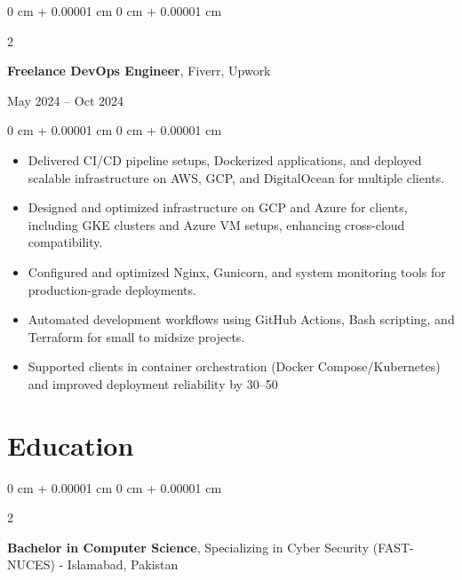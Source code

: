 \documentclass[10pt, letterpaper]{article}
\newenvironment{highlights}{
    \begin{itemize}[
        topsep=0.10 cm,
        parsep=0.10 cm,
        partopsep=0pt,
        itemsep=0pt,
        leftmargin=0 cm + 10pt
    ]
}{
    \end{itemize}
}
\newenvironment{onecolentry}{
    \begin{adjustwidth}{
        0 cm + 0.00001 cm
    }{
        0 cm + 0.00001 cm
    }
}{
    \end{adjustwidth}
}
\newenvironment{twocolentry}[2][]{
    \onecolentry
    \def\secondColumn{#2}
    \setcolumnwidth{\fill, 4.5 cm}
    \begin{paracol}{2}
}{
    \switchcolumn \raggedleft \secondColumn
    \end{paracol}
    \endonecolentry
}
\begin{document}
\vspace{0.10 cm}

\begin{twocolentry}{May 2024 -- Oct 2024}
    \textbf{Freelance DevOps Engineer}, Fiverr, Upwork
\end{twocolentry}
\vspace{0.10 cm}
\begin{onecolentry}
    \begin{highlights}
        \item Delivered CI/CD pipeline setups, Dockerized applications, and deployed scalable infrastructure on AWS, GCP, and DigitalOcean for multiple clients.
        \item Designed and optimized infrastructure on GCP and Azure for clients, including GKE clusters and Azure VM setups, enhancing cross-cloud compatibility.
        \item Configured and optimized Nginx, Gunicorn, and system monitoring tools for production-grade deployments.
        \item Automated development workflows using GitHub Actions, Bash scripting, and Terraform for small to midsize projects.
        \item Supported clients in container orchestration (Docker Compose/Kubernetes) and improved deployment reliability by 30–50%
    \end{highlights}
\end{onecolentry}  

\section{Education}
\vspace{0.10 cm}
\begin{twocolentry}{}
    \textbf{Bachelor in Computer Science}, Specializing in Cyber Security (FAST-NUCES) - Islamabad, Pakistan
\end{twocolentry}

\vspace{0.5 cm}

\end{document}
